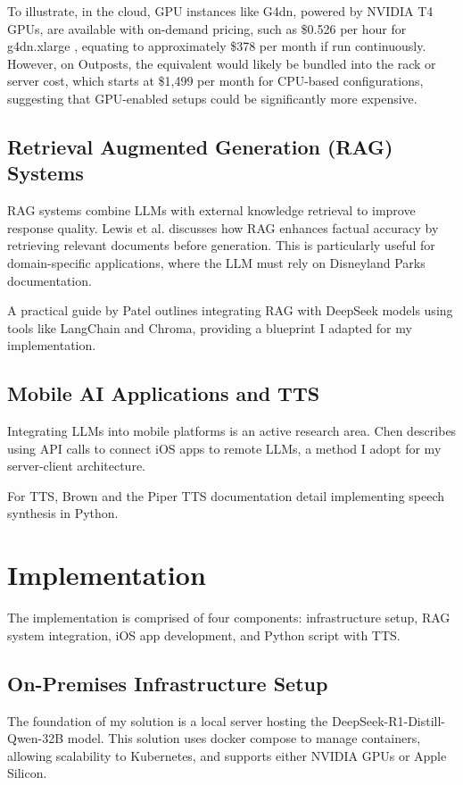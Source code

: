 \documentclass[11pt]{article}
\begin{document}
To illustrate, in the cloud, GPU instances like G4dn, powered by NVIDIA T4 GPUs, are available with on-demand pricing, such as \$0.526 per hour for g4dn.xlarge \cite{aws_g4_instances}, equating to approximately \$378 per month if run continuously. However, on Outposts, the equivalent would likely be bundled into the rack or server cost, which starts at \$1,499 per month for CPU-based configurations, suggesting that GPU-enabled setups could be significantly more expensive.

\subsection{Retrieval Augmented Generation (RAG) Systems}
RAG systems combine LLMs with external knowledge retrieval to improve response quality. Lewis et al. \cite{survey_evaluation_llms} discusses how RAG enhances factual accuracy by retrieving relevant documents before generation. This is particularly useful for domain-specific applications, where the LLM must rely on Disneyland Parks documentation.

A practical guide by Patel \cite{building_rag_deepseek} outlines integrating RAG with DeepSeek models using tools like LangChain and Chroma, providing a blueprint I adapted for my implementation.

\subsection{Mobile AI Applications and TTS}
Integrating LLMs into mobile platforms is an active research area. Chen \cite{integrate_llm_ios} describes using API calls to connect iOS apps to remote LLMs, a method I adopt for my server-client architecture.

For TTS, Brown \cite{tts_python} and the Piper TTS documentation \cite{piper_tts_python} detail implementing speech synthesis in Python.

\section{Implementation}
\label{sec:implementation}
The implementation is comprised of four components: infrastructure setup, RAG system integration, iOS app development, and Python script with TTS.

\subsection{On-Premises Infrastructure Setup}
The foundation of my solution is a local server hosting the DeepSeek-R1-Distill-Qwen-32B model. This solution uses docker compose to manage containers, allowing scalability to Kubernetes, and supports either NVIDIA GPUs or Apple Silicon.
\end{document}
